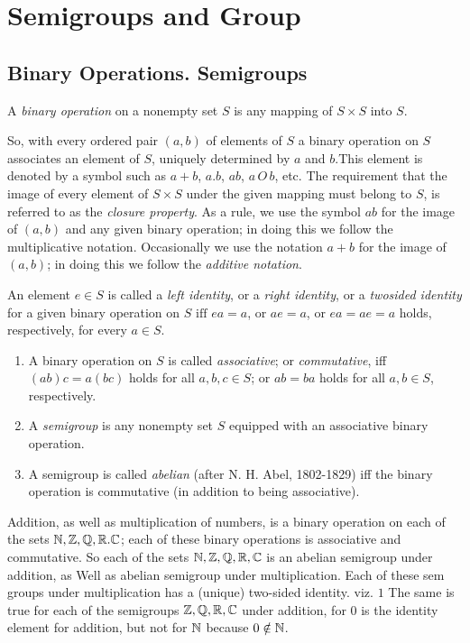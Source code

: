 \documentclass[12pt]{article}
\begin{document}
\section{Semigroups and Group}
\subsection{Binary Operations. Semigroups}
\begin{defn}
    A \emph{binary operation} on a nonempty set $ S $ is any mapping of $ S\times S $ into $ S $.
\end{defn}

So, with every ordered pair $ (a,b) $ of elements of $ S $ a binary operation on $ S $ associates an element of $ S $, uniquely determined by $ a $ and $ b $.This element is denoted by a symbol such as $ a + b $, $ a.b $, $ ab $, $ a \,O\, b $, etc. The requirement that the image of every element of $ S \times S $ under the given mapping must belong to $ S $, is referred to as the \emph{closure property}. As a rule, we use the symbol $ ab $ for the image of $ (a, b) $ and any given binary operation; in doing this we follow the multiplicative notation. Occasionally we use the notation $ a + b $ for the image of $ (a, b) $; in doing this we follow the \emph{additive notation}.
\begin{defn}
    An element $ e \in S $ is called a \emph{left identity}, or a \emph{right identity}, or a \emph{twosided identity} for a given binary operation on $ S \text{ iff } ea = a $, or $ ae = a $, or $ ea = ae = a $ holds, respectively, for every $ a \in S $.
\end{defn}
\begin{defn}\label{defn:2.3}
    \hfill
    \begin{enumerate}[label={(\roman*)}]
        \item A binary operation on $ S $ is called \emph{associative}; or \emph{commutative}, iff $ (ab)c = a(bc) $ holds for all $ a, b, c \in S $; or $ ab = ba $ holds for all $ a, b \in S $, respectively.
        \item A \emph{semigroup} is any nonempty set $ S $ equipped with an associative binary operation.
        \item A semigroup is called \emph{abelian} (after N. H. Abel, 1802-1829) iff the binary operation is commutative (in addition to being associative).
    \end{enumerate}
\end{defn}
\begin{ex}
    Addition, as well as multiplication of numbers, is a binary operation on each of the sets $ \mathbb{N} , \mathbb{Z}, \mathbb{Q}, \mathbb{R}. \mathbb{C}$; each of these binary operations is associative and commutative. So each of the sets $\mathbb{N}, \mathbb{Z}, \mathbb{Q}, \mathbb{R}, \mathbb{C} $ is an abelian semigroup under addition, as Well as abelian semigroup under multiplication. Each of these sem groups under multiplication has a (unique) two-sided identity. viz. $ 1 $ The same is true for each of the semigroups $ \mathbb{Z}, \mathbb{Q}, \mathbb{R}, \mathbb{C} $ under addition, for $ 0 $  is the identity element for addition, but not for $ \mathbb{N} $ because $ 0\notin \mathbb{N} $.
\end{ex}
\end{document}
